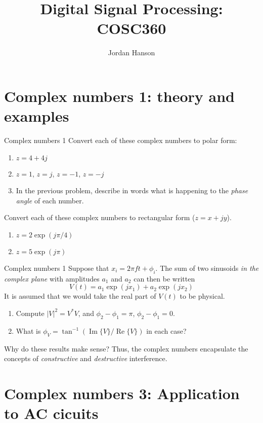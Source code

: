 \documentclass{beamer}
\title{Digital Signal Processing: COSC360}
\author{Jordan Hanson}
\institute{Whittier College Department of Physics and Astronomy}
\begin{document}
\maketitle

\section{Complex numbers 1: theory and examples}

\begin{frame}{Complex numbers 1}
Convert each of these complex numbers to polar form:
\begin{enumerate}
\item $z = 4 + 4j$
\item $z = 1$, $z = j$, $z = -1$, $z = -j$
\item In the previous problem, describe in words what is happening to the \textit{phase angle} of each number.
\end{enumerate}
Convert each of these complex numbers to rectangular form ($z = x + jy$).
\begin{enumerate}
\item $z = 2 \exp(j \pi/4)$
\item $z = 5 \exp(j \pi)$
\end{enumerate}
\end{frame}

\begin{frame}{Complex numbers 1}
Suppose that $x_i = 2\pi ft+\phi_i$.  The sum of two sinusoids \textit{in the complex plane} with amplitudes $a_1$ and $a_2$ can then be written
\begin{equation}
V(t) = a_1\exp(j x_1) + a_2\exp(j x_2)
\end{equation}
It is assumed that we would take the real part of $V(t)$ to be physical.
\begin{enumerate}
\item Compute $|V|^2 = V^*V$, and $\phi_2 - \phi_1 = \pi$, $\phi_2 - \phi_1 = 0$.
\item What is $\phi_V = \tan^{-1}(\operatorname{Im}\lbrace V \rbrace/\operatorname{Re}\lbrace V \rbrace)$ in each case?
\end{enumerate}
Why do these results make sense?  Thus, the complex numbers encapsulate the concepts of \textit{constructive} and \textit{destructive} interference.
\end{frame}

\section{Complex numbers 3: Application to AC cicuits}
\end{document}
